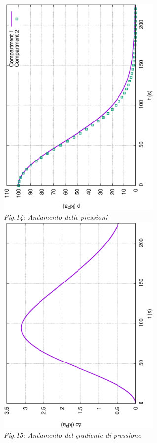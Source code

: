 \documentclass{article}
\begin{document}
        \pagebreak
        \begin{center}
            \includegraphics[width=0.6\textwidth, angle=-90]{MUL2/p_ES2_6.eps}\\ 
            \label{fig:press_10_6}
            \textit{Fig.14: Andamento delle pressioni} \\ 
            \includegraphics[width=0.6\textwidth, angle=-90]{MUL2/Dp_ES2_6.eps}\\
            \label{fig:grad_press_10_6}
            \textit{Fig.15: Andamento del gradiente di pressione}\\
        \end{center}
        \pagebreak
\end{document}

